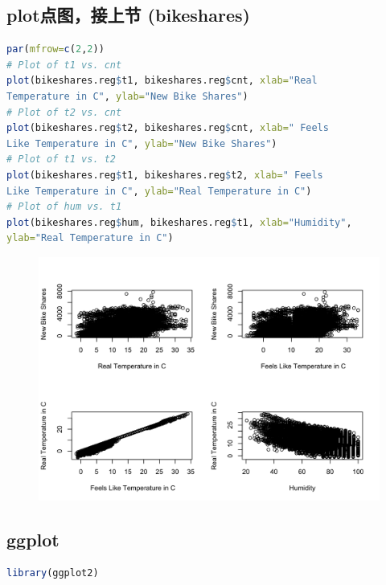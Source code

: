 \documentclass[11pt,a4paper]{article}
\begin{document}
\subsection{plot点图，接上节 (bikeshares)}
\begin{lstlisting}[language=R]
par(mfrow=c(2,2))
# Plot of t1 vs. cnt
plot(bikeshares.reg$t1, bikeshares.reg$cnt, xlab="Real
Temperature in C", ylab="New Bike Shares")
# Plot of t2 vs. cnt
plot(bikeshares.reg$t2, bikeshares.reg$cnt, xlab=" Feels
Like Temperature in C", ylab="New Bike Shares")
# Plot of t1 vs. t2
plot(bikeshares.reg$t1, bikeshares.reg$t2, xlab=" Feels
Like Temperature in C", ylab="Real Temperature in C")
# Plot of hum vs. t1
plot(bikeshares.reg$hum, bikeshares.reg$t1, xlab="Humidity",
ylab="Real Temperature in C")
\end{lstlisting}
\begin{center}\begin{figure}[htbp]
    \centering
    \includegraphics[scale=0.3]{Bike.png}
    \caption{}
    \label{}
\end{figure}\end{center}

\subsection{ggplot}
\begin{lstlisting}[language=R]
library(ggplot2)
\end{lstlisting}
\end{document}
